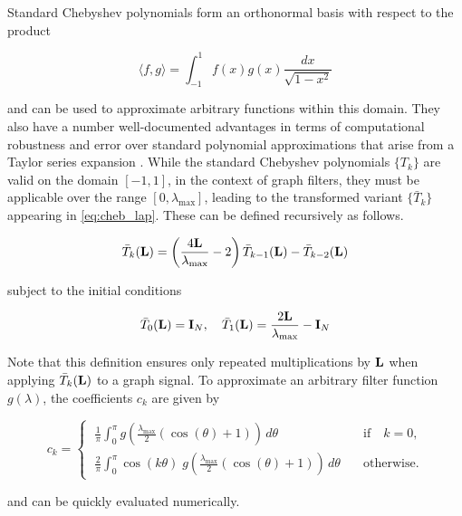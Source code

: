 Standard Chebyshev polynomials form an orthonormal basis with respect to the product

\begin{equation}
    \langle f, g \rangle = \int_{-1}^1 f(x) g(x) \frac{dx}{\sqrt{1 - x^2}}
\end{equation}

and can be used to approximate arbitrary functions within this domain. They also have a number well-documented advantages in terms of computational robustness and error over standard polynomial approximations that arise from a Taylor series expansion \citep{Rivlin2020}. While the standard Chebyshev polynomials $\{T_k\}$ are valid on the domain $[-1, 1]$, in the context of graph filters, they must be applicable over the range $[0, \lambda_{\text{max}}]$, leading to the transformed variant $\{\bar{T}_k\}$ appearing in \cref{eq:cheb_lap}. These can be defined recursively as follows. 

\begin{equation}
    \bar{T}_k(\mathbf{L}) = \left(\frac{4 \mathbf{L} }{\lambda_{\text{max}}}  - 2\right) \bar{T}_{k-1}(\mathbf{L}) - \bar{T}_{k-2}(\mathbf{L})
\end{equation}

subject to the initial conditions

\begin{equation}
    \bar{T}_0(\mathbf{L}) = \mathbf{I}_N, \quad \bar{T}_1(\mathbf{L}) = \frac{2 \mathbf{L} }{\lambda_{\text{max}}} - \mathbf{I}_N
\end{equation}

Note that this definition ensures only repeated multiplications by $\mathbf{L}$ when applying $\bar{T}_k(\mathbf{L})$ to a graph signal. To approximate an arbitrary filter function $g(\lambda)$, the coefficients $c_k$ are given by 

\begin{equation}
    \label{eq:Cheb_int}
    c_k = \begin{cases}
        \displaystyle   
        \; \frac{1}{\pi} \int_{0}^{\pi} g\left(\frac{\lambda_{\text{max}}}{2} (\cos(\theta) + 1)\right) \, d\theta  & \quad \text{if} \quad k = 0, \\[0.8cm]
        \displaystyle   
        \; \frac{2}{\pi} \int_{0}^{\pi} \cos(k \theta) \; g\left(\frac{\lambda_{\text{max}}}{2} (\cos(\theta) + 1)\right) \, d\theta  & \quad \text{otherwise.}
    \end{cases}
\end{equation}

and can be quickly evaluated numerically. 

